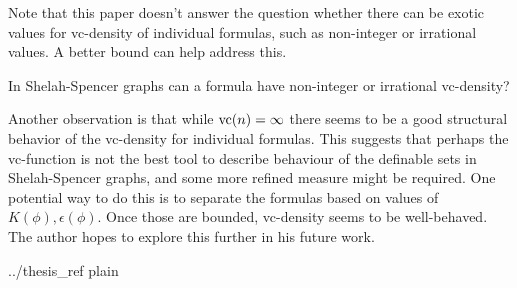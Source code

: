 \documentclass{amsart}
\begin{document}
Note that this paper doesn't answer the question whether there can be exotic values for vc-density of individual formulas,
such as non-integer or irrational values.
A better bound can help address this.
\begin{openq}
  In Shelah-Spencer graphs can a formula have non-integer or irrational vc-density?
\end{openq}
Another observation is that while $\operatorname{vc}(n) = \infty$ there seems to be a good structural behavior of the vc-density for individual formulas.
This suggests that perhaps the vc-function is not the best tool to describe behaviour of the definable sets in Shelah-Spencer graphs,
and some more refined measure might be required.
One potential way to do this is to separate the formulas based on values of $K(\phi), \epsilon(\phi)$.
Once those are bounded, vc-density seems to be well-behaved.
The author hopes to explore this further in his future work.

 {../thesis_ref}    %
 {plain}



 
\end{document}
